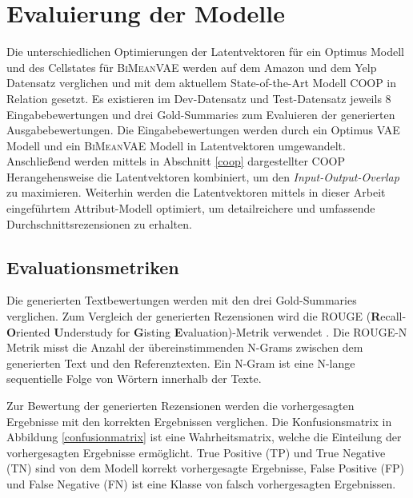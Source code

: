 \section{Evaluierung der Modelle}\raggedbottom
\label{evalmetric}
Die unterschiedlichen Optimierungen der Latentvektoren für ein Optimus Modell und des Cellstates für \textsc{BiMeanVAE} werden auf dem Amazon und dem Yelp Datensatz verglichen und mit dem aktuellem State-of-the-Art Modell COOP in Relation gesetzt.
Es existieren im Dev-Datensatz und Test-Datensatz jeweils 8 Eingabebewertungen und drei Gold-Summaries zum Evaluieren der generierten Ausgabebewertungen.
Die Eingabebewertungen werden durch ein Optimus VAE Modell und ein \textsc{BiMeanVAE} Modell in Latentvektoren umgewandelt.
Anschließend werden mittels in Abschnitt \ref{coop} dargestellter COOP Herangehensweise die Latentvektoren kombiniert, um den \textit{Input-Output-Overlap} zu maximieren. 
Weiterhin werden die Latentvektoren mittels in dieser Arbeit eingeführtem Attribut-Modell optimiert, um detailreichere und umfassende Durchschnittsrezensionen zu erhalten.


\subsection{Evaluationsmetriken}
Die generierten Textbewertungen werden mit den drei Gold-Summaries verglichen.
Zum Vergleich der generierten Rezensionen wird die ROUGE (\textbf{R}ecall-\textbf{O}riented \textbf{U}nderstudy for \textbf{G}isting \textbf{E}valuation)-Metrik verwendet \citep{lin-2004-rouge}.
Die ROUGE-N Metrik misst die Anzahl der übereinstimmenden N-Grams zwischen dem generierten Text und den Referenztexten. 
Ein N-Gram ist eine N-lange sequentielle Folge von Wörtern innerhalb der Texte. 

Zur Bewertung der generierten Rezensionen werden die vorhergesagten Ergebnisse mit den korrekten Ergebnissen verglichen. 
Die Konfusionsmatrix in Abbildung \ref{confusionmatrix} ist eine Wahrheitsmatrix, welche die Einteilung der vorhergesagten Ergebnisse ermöglicht. 
True Positive (TP) und True Negative (TN) sind von dem Modell korrekt vorhergesagte Ergebnisse, False Positive (FP) und False Negative (FN) ist eine Klasse von falsch vorhergesagten Ergebnissen.



